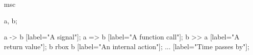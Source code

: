 \begin{msc}
	msc{
        	a, b;

        	a -> b [label="A signal"];
        	a => b [label="A function call"];
        	b >> a [label="A return value"];
        	b rbox b [label="An internal action"];
		... [label="Time passes by"];
	}
\end{msc}
